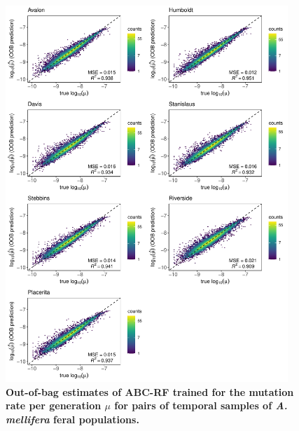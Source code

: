 \documentclass[a4paper, 12pt]{article}
\begin{document}
\begin{figure}[ht]
  \centering
  \includegraphics[width=0.95\textwidth]{Figures/FigureS22_combined_plot_mu.pdf}
  \small\caption{\textbf{Out-of-bag estimates of ABC-RF trained for the mutation rate per generation $\mu$ for pairs of temporal samples of \textit{A. mellifera} feral populations.}}
  \label{fig:supple_feralbee_mu}
\end{figure}
\end{document}
